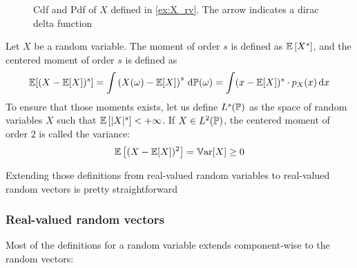 \documentclass[../../Main_ManuscritThese.tex]{subfiles}
\begin{document}
\begin{figure}[!h]
  \centering
  
  \caption{Cdf and Pdf of $X$ defined in \cref{ex:X_rv}. The arrow indicates a dirac delta function}
  \label{fig:example_pdf_cdf}
\end{figure}

\begin{definition}
  Let $X$ be a random variable.
  The moment of order $s$ is defined as $\mathbb{E}\left[X^s\right]$, and the centered moment of order $s$ is defined as
  \begin{equation}
    \mathbb{E}[(X-\mathbb{E}[X])^s]=\int \left(X(\omega) - \mathbb{E}[X]\right)^s \,\mathrm{d}\mathbb{P}(\omega) = \int (x-\mathbb{E}[X])^s\cdot p_X(x)\,\mathrm{d}x
  \end{equation}
  To ensure that those moments exists, let us define $L^s(\mathbb{P})$ as the space of random variables $X$ such that $\mathbb{E}\left[\lvert X \rvert^s\right] < +\infty$.
  If $X\in L^2(\mathbb{P})$, the centered moment of order $2$ is called the variance:
  \begin{equation}
    \label{eq:variance_def}
    \mathbb{E}\left[(X-\mathbb{E}[X])^2 \right] = \mathbb{V}\mathrm{ar}[X] \geq 0
  \end{equation}
\end{definition}


Extending those definitions from real-valued random variables to real-valued random vectors is pretty straightforward

\subsubsection{Real-valued random vectors}
 Most of the definitions for a random variable extends component-wise to the random vectors:
\end{document}
